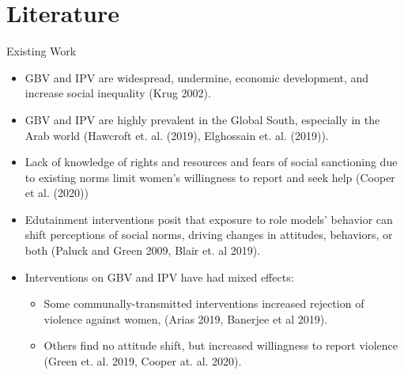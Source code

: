 \documentclass[10pt]{beamer}
\begin{document}

\section{Literature}
\begin{frame}{Existing Work}
\begin{itemize}
    \item GBV and IPV are widespread, undermine, economic development, and increase social inequality   \small(Krug 2002). \normalsize
    \item GBV and IPV are highly prevalent in the Global South, especially in the Arab world \small(Hawcroft et. al. (2019), Elghossain et. al. (2019)). \normalsize 
    \item Lack of knowledge of rights and resources and fears of social sanctioning due to existing norms limit women’s willingness to report and seek help (Cooper et al. (2020))
    \item Edutainment interventions posit that exposure to role models' behavior can shift perceptions of social norms, driving changes in attitudes, behaviors, or both  \small(Paluck and Green 2009, Blair et. al 2019). \normalsize
    \item Interventions on  GBV and IPV have had mixed effects:
    \begin{itemize}
        \item Some communally-transmitted interventions increased rejection of violence against women,  \small(Arias 2019, Banerjee et al 2019). \normalisize
        \item Others find no attitude shift, but increased willingness to report violence \small(Green et. al. 2019, Cooper at. al. 2020).  
    \end{itemize} \normalisize

\end{itemize}
\end{frame}
\end{document}
